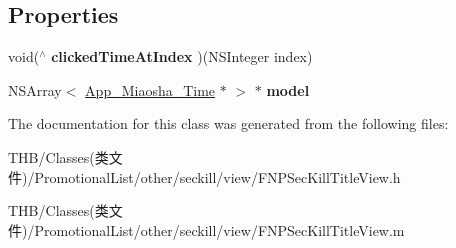\subsection*{Properties}
\begin{DoxyCompactItemize}
\item 
\mbox{\label{interface_f_n_p_sec_kill_title_view_aba99e5a0c51a8cf28bd2f60b916d34d4}} 
void($^\wedge$ {\bfseries clicked\+Time\+At\+Index} )(N\+S\+Integer index)
\item 
\mbox{\label{interface_f_n_p_sec_kill_title_view_afaf7e9f698337867d35c7dd32c37c53f}} 
N\+S\+Array$<$ \mbox{\hyperlink{interface_app___miaosha___time}{App\+\_\+\+Miaosha\+\_\+\+Time}} $\ast$ $>$ $\ast$ {\bfseries model}
\end{DoxyCompactItemize}


The documentation for this class was generated from the following files\+:\begin{DoxyCompactItemize}
\item 
T\+H\+B/\+Classes(类文件)/\+Promotional\+List/other/seckill/view/F\+N\+P\+Sec\+Kill\+Title\+View.\+h\item 
T\+H\+B/\+Classes(类文件)/\+Promotional\+List/other/seckill/view/F\+N\+P\+Sec\+Kill\+Title\+View.\+m\end{DoxyCompactItemize}
